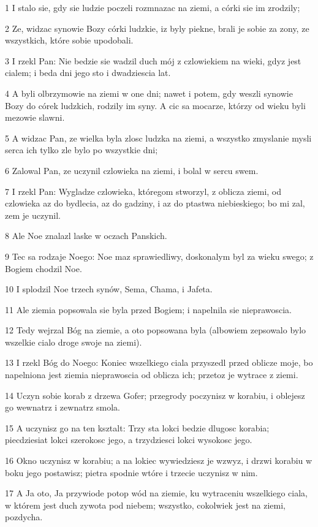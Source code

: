 \par 1 I stalo sie, gdy sie ludzie poczeli rozmnazac na ziemi, a córki sie im zrodzily;
\par 2 Ze, widzac synowie Bozy córki ludzkie, iz byly piekne, brali je sobie za zony, ze wszystkich, które sobie upodobali.
\par 3 I rzekl Pan: Nie bedzie sie wadzil duch mój z czlowiekiem na wieki, gdyz jest cialem; i beda dni jego sto i dwadziescia lat.
\par 4 A byli olbrzymowie na ziemi w one dni; nawet i potem, gdy weszli synowie Bozy do córek ludzkich, rodzily im syny. A cic sa mocarze, którzy od wieku byli mezowie slawni.
\par 5 A widzac Pan, ze wielka byla zlosc ludzka na ziemi, a wszystko zmyslanie mysli serca ich tylko zle bylo po wszystkie dni;
\par 6 Zalowal Pan, ze uczynil czlowieka na ziemi, i bolal w sercu swem.
\par 7 I rzekl Pan: Wygladze czlowieka, któregom stworzyl, z oblicza ziemi, od czlowieka az do bydlecia, az do gadziny, i az do ptastwa niebieskiego; bo mi zal, zem je uczynil.
\par 8 Ale Noe znalazl laske w oczach Panskich.
\par 9 Tec sa rodzaje Noego: Noe maz sprawiedliwy, doskonalym byl za wieku swego; z Bogiem chodzil Noe.
\par 10 I splodzil Noe trzech synów, Sema, Chama, i Jafeta.
\par 11 Ale ziemia popsowala sie byla przed Bogiem; i napelnila sie nieprawoscia.
\par 12 Tedy wejrzal Bóg na ziemie, a oto popsowana byla (albowiem zepsowalo bylo wszelkie cialo droge swoje na ziemi).
\par 13 I rzekl Bóg do Noego: Koniec wszelkiego ciala przyszedl przed oblicze moje, bo napelniona jest ziemia nieprawoscia od oblicza ich; przetoz je wytrace z ziemi.
\par 14 Uczyn sobie korab z drzewa Gofer; przegrody poczynisz w korabiu, i oblejesz go wewnatrz i zewnatrz smola.
\par 15 A uczynisz go na ten ksztalt: Trzy sta lokci bedzie dlugosc korabia; piecdziesiat lokci szerokosc jego, a trzydziesci lokci wysokosc jego.
\par 16 Okno uczynisz w korabiu; a na lokiec wywiedziesz je wzwyz, i drzwi korabiu w boku jego postawisz; pietra spodnie wtóre i trzecie uczynisz w nim.
\par 17 A Ja oto, Ja przywiode potop wód na ziemie, ku wytraceniu wszelkiego ciala, w którem jest duch zywota pod niebem; wszystko, cokolwiek jest na ziemi, pozdycha.
